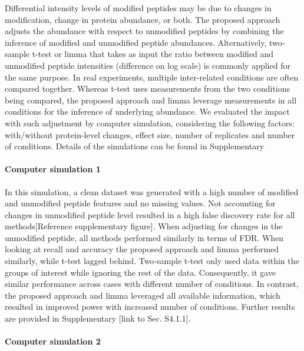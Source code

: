 \documentclass[mcp]{article}
\numberwithin{figure}{section} %
\numberwithin{table}{section}
\def\todo#1{{\color{red}[#1]}}
\begin{document}
Differential intensity levels of modified peptides may be due to changes in modification, change in protein abundance, or both. The proposed approach adjusts the abundance with respect to unmodified peptides by combining the inference of modified and unmodified peptide abundances. Alternatively, two-sample t-test or limma that takes as input the ratio between modified and unmodified peptide intensities (difference on log scale) is commonly applied for the same purpose. In real experiments, multiple inter-related conditions are often compared together. Whereas t-test uses measurements from the two conditions being compared, the proposed approach and limma leverage measurements in all conditions for the inference of underlying abundance. We evaluated the impact with such adjustment by computer simulation, considering the following factors: with/without protein-level changes, effect size, number of replicates and number of conditions. Details of the simulations can be found in Supplementary %

\paragraph*{Computer simulation 1} 

In this simulation, a clean dataset was generated with a high number of modified and unmodified peptide features and no missing values. Not accounting for changes in unmodified peptide level resulted in a high false discovery rate for all methods\todo{Reference supplementary figure}. When adjusting for changes in the unmodified peptide, all methods performed similarly in terms of FDR. When looking at recall and accuracy the proposed approach and limma performed similarly, while t-test lagged behind. Two-sample t-test only used data within the groups of interest while ignoring the rest of the data. Consequently, it gave similar performance across cases with different number of conditions. In contrast, the proposed approach and limma leveraged all available information, which resulted in improved power with increased number of conditions. Further results are provided in Supplementary \todo{link to Sec. S4.1.1}. 

\paragraph*{Computer simulation 2} 
\end{document}
